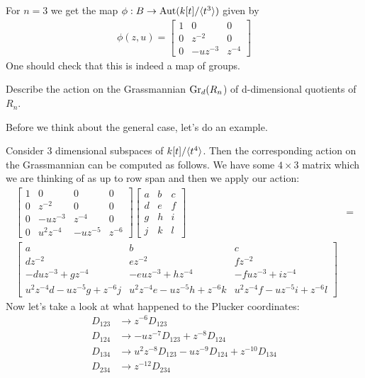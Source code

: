 \documentclass[12pt]{article}
\begin{document}
\begin{example}
    For $n=3$ we get the map $\phi:B\to \operatorname{Aut}(k[t]/\langle{t^3}\rangle)$ given by \begin{align*}
        \phi(z,u) = \begin{bmatrix}
            1 & 0 & 0 \\
            0 & z^{-2} & 0 \\
            0 & -uz^{-3} & z^{-4}
        \end{bmatrix}
    \end{align*}
    One should check that this is indeed a map of groups.
\end{example}

\begin{exercise}Describe the action on the Grassmannian $\operatorname{Gr}_d(R_n$) of d-dimensional quotients of $R_n$.\end{exercise}
Before we think about the general case, let's do an example.
\begin{example}
    Consider $3$ dimensional subspaces of $k[t]/\langle{t^4}\rangle$. Then the corresponding action on the 
    Grassmannian can be computed as follows. We have some $4\times 3$ matrix which we are 
    thinking of as up to row span and then we apply our action: \begin{align*}
        \begin{bmatrix}
            1 & 0 & 0 & 0\\
            0 & z^{-2} & 0 & 0\\
            0 & -uz^{-3} & z^{-4} & 0 \\
            0 & u^2z^{-4} & -uz^{-5} & z^{-6}
        \end{bmatrix}\begin{bmatrix}
            a & b & c \\
            d & e & f \\
            g & h & i \\
            j & k & l
        \end{bmatrix} &= \\ \begin{bmatrix}
            a & b & c \\
            dz^{-2} & ez^{-2} & fz^{-2} \\
            -duz^{-3} + gz^{-4} & -euz^{-3} + hz^{-4} & -fuz^{-3} + iz^{-4} \\
            u^2z^{-4}d - uz^{-5}g + z^{-6}j & u^2z^{-4}e - uz^{-5}h + z^{-6}k & u^2z^{-4}f - uz^{-5}i + z^{-6}l
        \end{bmatrix}
    \end{align*}
    Now let's take a look at what happened to the Plucker coordinates:
    \begin{align*}
        D_{123} &\to z^{-6}D_{123} \\
        D_{124} &\to -uz^{-7}D_{123} + z^{-8}D_{124}\\
        D_{134} &\to u^2z^{-8}D_{123} - uz^{-9}D_{124} + z^{-10}D_{134}\\
        D_{234} &\to z^{-12}D_{234}
    \end{align*}
\end{example}
\end{document}
